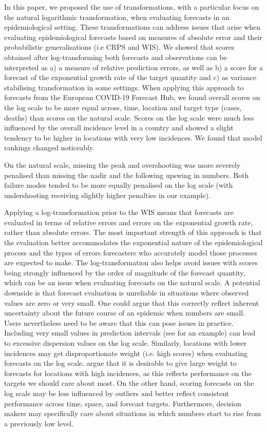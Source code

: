 \documentclass[10pt,letterpaper]{article}
\begin{document}
In this paper, we proposed the use of transformations, with a particular focus on the natural logarithmic transformation, when evaluating forecasts in an epidemiological setting. These transformations can address issues that arise when evaluating epidemiological forecasts based on measures of absolute error and their probabilistic generalisations (i.e CRPS and WIS). We showed that scores obtained after log-transforming both forecasts and observations can be interpreted as a) a measure of relative prediction errors, as well as b) a score for a forecast of the exponential growth rate of the target quantity and c) as variance stabilising transformation in some settings.
When applying this approach to forecasts from the European COVID-19 Forecast Hub, we found overall scores on the log scale to be more equal across, time, location and target type (cases, deaths) than scores on the natural scale. Scores on the log scale were much less influenced by the overall incidence level in a country and showed a slight tendency to be higher in locations with very low incidences. We found that model rankings changed noticeably. 

On the natural scale, missing the peak and overshooting was more severely penalised than missing the nadir and the following upswing in numbers. Both failure modes tended to be more equally penalised on the log scale (with undershooting receiving slightly higher penalties in our example). 

Applying a log-transformation prior to the WIS means that forecasts are evaluated in terms of relative errors and errors on the exponential growth rate, rather than absolute errors. The most important strength of this approach is that the evaluation better accommodates the exponential nature of the epidemiological process and the types of errors forecasters who accurately model those processes are expected to make. The log-transformation also helps avoid issues with scores being strongly influenced by the order of magnitude of the forecast quantity, which can be an issue when evaluating forecasts on the natural scale. 
A potential downside is that forecast evaluation is unreliable in situations where observed values are zero or very small. One could argue that this correctly reflect inherent uncertainty about the future course of an epidemic when numbers are small. Users nevertheless need to be aware that this can pose issues in practice. Including very small values in prediction intervals (see  for an example) can lead to excessive dispersion values on the log scale. 
Similarly, locations with lower incidences may get disproportionate weight (i.e. high scores) when evaluating forecasts on the log scale. \cite{bracherEvaluatingEpidemicForecasts2021} argue that it is desirable to give large weight to forecasts for locations with high incidences, as this reflects performance on the targets we should care about most. On the other hand, scoring forecasts on the log scale may be less influenced by outliers and better reflect consistent performance across time, space, and forecast targets. Furthermore, decision makers may specifically care about situations in which numbers start to rise from a previously low level.
\end{document}
